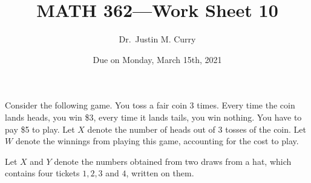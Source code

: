 \documentclass[addpoints,12pt]{exam}
\title{\vspace{-1in} MATH 362---Work Sheet 10}
\date{Due on Monday, March 15th, 2021}
\author{Dr.~Justin M. Curry}
\begin{document}
\maketitle


\begin{questions}

\question[3] Consider the following game. 
You toss a fair coin 3 times. Every time the coin lands heads, you win \$3, every time it lands tails, you win nothing. 
You have to pay \$5 to play. Let $X$ denote the number of heads out of 3 tosses of the coin. Let $W$ denote the winnings from playing this game, accounting for the cost to play.

\noaddpoints
{}
\addpoints

\question[6] Let $X$ and $Y$ denote the numbers obtained from two draws from a hat, which contains four tickets $1, 2, 3$ and $4$, written on them.

\noaddpoints
{}
\end{questions}
\end{document}

